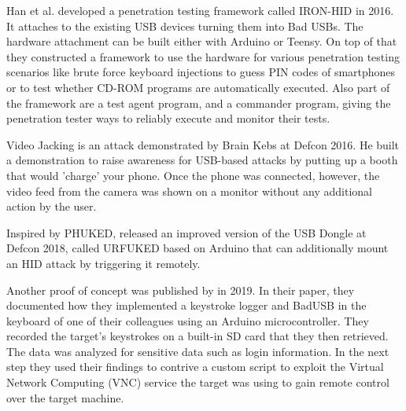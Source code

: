 Han et al.\cite{hanIRONHIDCreateYour2016} developed a penetration testing framework called IRON-HID in 2016. It attaches to the existing USB devices turning them into Bad USBs. The hardware attachment can be built either with Arduino or Teensy. On top of that they constructed a framework to use the hardware for various penetration testing scenarios like brute force keyboard injections to guess PIN codes of smartphones or to test whether CD-ROM programs are automatically executed. Also part of the framework are a test agent program, and a commander program, giving the penetration tester ways to reliably execute and monitor their tests.   

Video Jacking is an attack demonstrated by Brain Kebs \cite{RoadWarriorsBeware2016} at Defcon 2016. He built a demonstration to raise awareness for USB-based attacks by putting up a booth that would 'charge' your phone. Once the phone was connected, however, the video feed from the camera was shown on a monitor without any additional action by the user. 

Inspired by PHUKED, \cite{elkinsHackingHardwareIntroducing} released an improved version of the USB Dongle at Defcon 2018, called URFUKED based on Arduino that can additionally mount an HID attack by triggering it remotely.  

Another proof of concept was published by \cite{bojovicRisingThreatHardware2019} in 2019. In their paper, they documented how they implemented a keystroke logger and BadUSB in the keyboard of one of their colleagues using an Arduino microcontroller. They recorded the target's keystrokes on a built-in SD card that they then retrieved. The data was analyzed for sensitive data such as login information. In the next step they used their findings to contrive a custom script to exploit the Virtual Network Computing (VNC) service the target was using to gain remote control over the target machine. 

